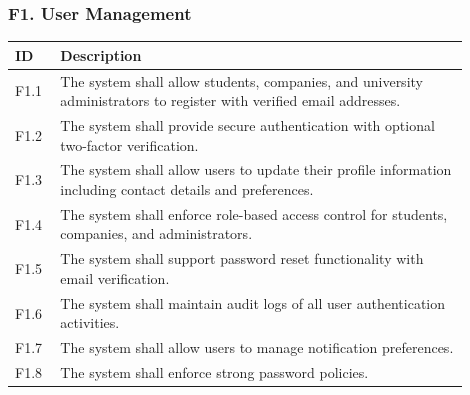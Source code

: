 \subsubsection{F1. User Management}
\begin{center}
    \begin{longtable}{ |l|p{0.9\linewidth}| }
        \hline
        \textbf{ID} & \textbf{Description} \\
        \hline
        F1.1 & The system shall allow students, companies, and university administrators to register with verified email addresses. \\
        \hline
        F1.2 & The system shall provide secure authentication with optional two-factor verification. \\
        \hline
        F1.3 & The system shall allow users to update their profile information including contact details and preferences. \\
        \hline
        F1.4 & The system shall enforce role-based access control for students, companies, and administrators. \\
        \hline
        F1.5 & The system shall support password reset functionality with email verification. \\
        \hline
        F1.6 & The system shall maintain audit logs of all user authentication activities. \\
        \hline
        F1.7 & The system shall allow users to manage notification preferences. \\
        \hline
        F1.8 & The system shall enforce strong password policies. \\
        \hline
    \end{longtable}
\end{center}

